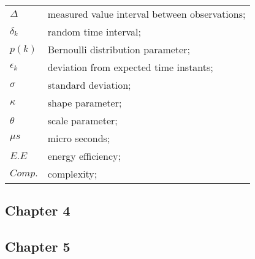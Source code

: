 \begin{longtable}{ll}
	$\Delta$				& measured value interval between observations; \\
	$\delta_k$				& random time interval; \\
	
	$p(k)$					& Bernoulli distribution parameter; \\
	$\epsilon_k$			& deviation from expected time instants; \\
	$\sigma$				& standard deviation; \\
	$\kappa$				& shape parameter; \\
	$\theta$				& scale parameter; \\
	
	$\mu s$					& micro seconds; \\
	$E.E$					& energy efficiency; \\
	$Comp.$					& complexity; \\
	
	
		

\end{longtable}


\subsection*{Chapter 4}


\subsection*{Chapter 5}

\newpage
